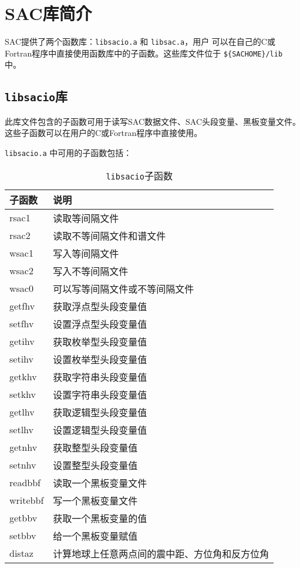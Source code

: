 \section{SAC库简介}
SAC提供了两个函数库：\texttt{libsacio.a} 和 \texttt{libsac.a}，用户
可以在自己的C或Fortran程序中直接使用函数库中的子函数。这些库文件位于
\verb|${SACHOME}/lib| 中。

\subsection{\texttt{libsacio}库}
此库文件包含的子函数可用于读写SAC数据文件、SAC头段变量、黑板变量文件。
这些子函数可以在用户的C或Fortran程序中直接使用。

\texttt{libsacio.a} 中可用的子函数包括：
\begin{table}[H]
\centering
\caption{\texttt{libsacio}子函数}
\ttfamily
\begin{tabular}{ll}
\toprule
子函数      &       说明            \\
\midrule
rsac1       &       读取等间隔文件  \\
rsac2       &       读取不等间隔文件和谱文件    \\
wsac1       &       写入等间隔文件  \\
wsac2       &       写入不等间隔文件    \\
wsac0       &       可以写等间隔文件或不等间隔文件  \\
getfhv      &       获取浮点型头段变量值    \\
setfhv      &       设置浮点型头段变量值    \\
getihv      &       获取枚举型头段变量值    \\
setihv      &       设置枚举型头段变量值    \\
getkhv      &       获取字符串头段变量值    \\
setkhv      &       设置字符串头段变量值    \\
getlhv      &       获取逻辑型头段变量值    \\
setlhv      &       设置逻辑型头段变量值    \\
getnhv      &       获取整型头段变量值      \\
setnhv      &       设置整型头段变量值  \\
readbbf     &       读取一个黑板变量文件    \\
writebbf    &       写一个黑板变量文件      \\
getbbv      &       获取一个黑板变量的值    \\
setbbv      &       给一个黑板变量赋值      \\
distaz      &       计算地球上任意两点间的震中距、方位角和反方位角  \\
\bottomrule
\end{tabular}
\end{table}

